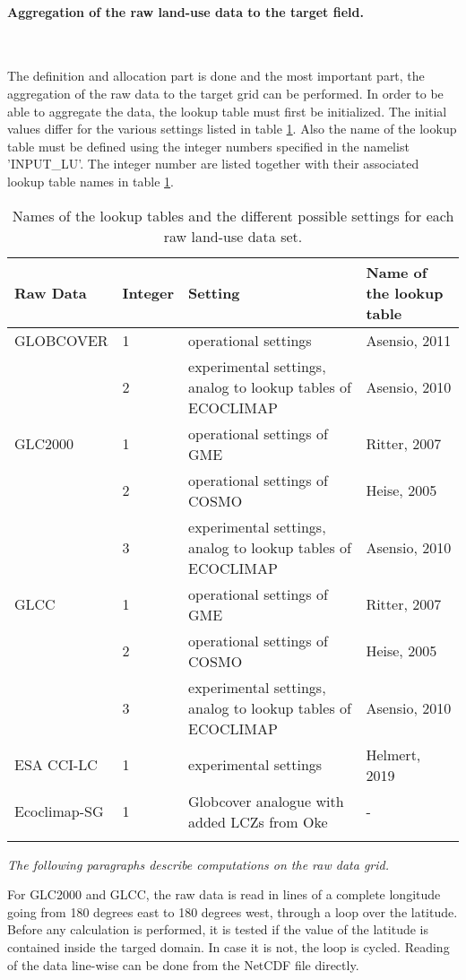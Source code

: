 \documentclass[a4paper,10pt,DIV14,BCOR1cm,titlepage,twoside]{scrartcl}
\providecommand{\tabularnewline}{\\}
\begin{document}
\paragraph{Aggregation of the raw land-use data to the target field.}\ \par\medskip\noindent
The definition and allocation part is done and the most important part, the aggregation of the raw data to the target grid can be performed. In order to be able to aggregate the data, the lookup table must first be initialized. The initial values differ for the various settings listed in table \ref{tab:look_up_table}. Also the name of the lookup table must be defined using the integer numbers specified in the namelist 'INPUT\_LU'. The integer number are listed together with their associated lookup table names in table \ref{tab:look_up_table}.
\begin{longtable}{p{2.25cm}p{1.25cm}p{6.5cm}p{4.5cm}}
\textbf{Raw Data} & \textbf{Integer} & \textbf{Setting} & \textbf{Name of the lookup table}\tabularnewline
\hline
\endhead
\hline
GLOBCOVER & 1 & operational settings & Asensio, 2011 \tabularnewline
          & 2 & experimental settings, analog to lookup tables of ECOCLIMAP& Asensio, 2010 \tabularnewline\hline
GLC2000 & 1 & operational settings of GME & Ritter, 2007 \tabularnewline
        & 2 & operational settings of COSMO & Heise, 2005 \tabularnewline
        & 3 & experimental settings, analog to lookup tables of ECOCLIMAP & Asensio, 2010 \tabularnewline\hline
GLCC & 1 & operational settings of GME & Ritter, 2007 \tabularnewline
     & 2 & operational settings of COSMO & Heise, 2005 \tabularnewline
     & 3 & experimental settings, analog to lookup tables of ECOCLIMAP & Asensio, 2010 \tabularnewline\hline
ESA CCI-LC & 1 & experimental settings & Helmert, 2019 \tabularnewline\hline
Ecoclimap-SG & 1 & Globcover analogue with added LCZs from Oke & - \tabularnewline
\bottomrule
\caption{Names of the lookup tables and the different possible settings for each raw land-use data set.}
\label{tab:look_up_table}
\end{longtable}
\par\medskip\noindent
\textit{The following paragraphs describe computations on the raw data grid.} \par\medskip\noindent
For GLC2000 and GLCC, the raw data is read in lines of a complete longitude going from 180 degrees east to 180 degrees west, through a loop over the latitude. Before any calculation is performed, it is tested if the value of the latitude is contained inside the targed domain. In case it is not, the loop is cycled. Reading of the data line-wise can be done from the NetCDF file directly. \par\medskip\noindent
\end{document}
